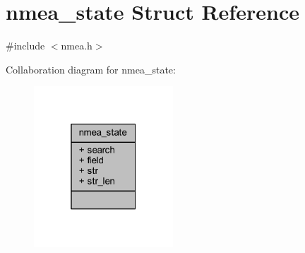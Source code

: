\hypertarget{structnmea__state}{}\section{nmea\+\_\+state Struct Reference}
\label{structnmea__state}


{\ttfamily \#include $<$nmea.\+h$>$}



Collaboration diagram for nmea\+\_\+state\+:
\nopagebreak
\begin{figure}[H]
\begin{center}
\leavevmode
\includegraphics[width=148pt]{structnmea__state__coll__graph}
\end{center}
\end{figure}
